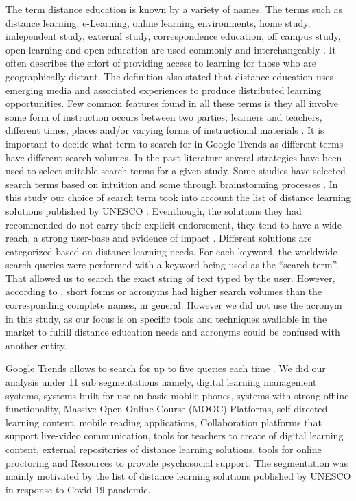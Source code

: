 \documentclass[11pt,a4paper,]{article}
\begin{document}
The term distance education is known by a variety of names. The terms such as distance learning, e-Learning, online learning environments, home study, independent study, external
study, correspondence education, off campus study, open learning and open education are used commonly and interchangeably \autocite{moore2011learning}. It often describes the effort of providing access to learning for those who are geographically distant.
The definition also stated that distance education uses emerging media and associated experiences to produce distributed learning opportunities. Few common features found in all these terms is they all involve some form of instruction occurs between two parties; learners and teachers, different times, places and/or varying forms of instructional materials \autocite{moore2011learning}. It is important to decide what term to search for in Google Trends as different terms have different search volumes. In the past literature several strategies have been used to select suitable search terms for a given study. Some studies have selected search terms based on intuition and some through brainstorming processes \autocite{vaughan2014web}. In this study our choice of search term took into account the list of distance learning solutions published by UNESCO \autocite{unesco2020DLsolutions}.
Eventhough, the solutions they had recommended do not carry their explicit endorsement, they tend to have a wide reach, a strong user-base and evidence of impact \autocite{unesco2020DLsolutions}. Different solutions are categorized based on distance learning needs. For each keyword, the worldwide search queries were performed with a keyword being used as the ``search term''. That allowed us to search the exact string of text typed by the user. However, according to \textcite{vaughan2014web}, short forms or acronyms had higher search volumes than the corresponding complete names, in general. However we did not use the acronym in this study, as our focus is on specific tools and techniques available in the market to fulfill distance education needs and acronyms could be confused with another entity.

Google Trends allows to search for up to five queries each time \autocite{vaughan2014web}. We did our analysis under 11 sub segmentations namely, digital learning management systems, systems built for use on basic mobile phones, systems with strong offline functionality, Massive Open Online Course (MOOC) Platforms, self-directed learning content, mobile reading applications, Collaboration platforms that support live-video communication, tools for teachers to create of digital learning content, external repositories of distance learning solutions, tools for online proctoring and Resources to provide psychosocial support. The segmentation was mainly motivated by the list of distance learning solutions published by UNESCO in response to Covid 19 pandemic.
\end{document}
